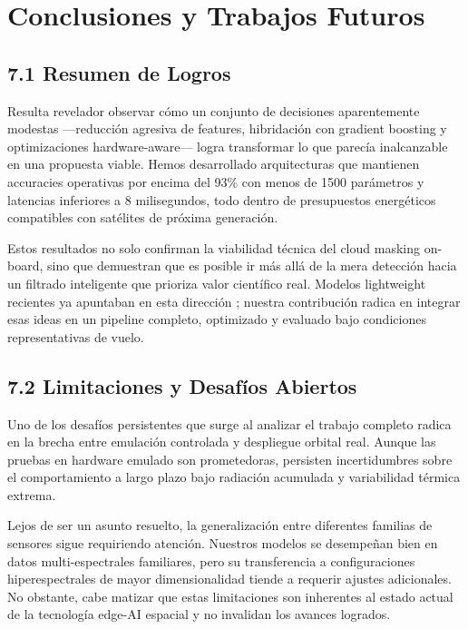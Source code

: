 \section{Conclusiones y Trabajos Futuros}

\subsection{7.1 Resumen de Logros}

Resulta revelador observar cómo un conjunto de decisiones aparentemente modestas —reducción agresiva de features, hibridación con gradient boosting y optimizaciones hardware-aware— logra transformar lo que parecía inalcanzable en una propuesta viable. Hemos desarrollado arquitecturas que mantienen accuracies operativas por encima del 93\% con menos de 1500 parámetros y latencias inferiores a 8 milisegundos, todo dentro de presupuestos energéticos compatibles con satélites de próxima generación.

Estos resultados no solo confirman la viabilidad técnica del cloud masking on-board, sino que demuestran que es posible ir más allá de la mera detección hacia un filtrado inteligente que prioriza valor científico real. Modelos lightweight recientes ya apuntaban en esta dirección \cite{Ali2026_Lightweight}; nuestra contribución radica en integrar esas ideas en un pipeline completo, optimizado y evaluado bajo condiciones representativas de vuelo.

\subsection{7.2 Limitaciones y Desafíos Abiertos}

Uno de los desafíos persistentes que surge al analizar el trabajo completo radica en la brecha entre emulación controlada y despliegue orbital real. Aunque las pruebas en hardware emulado son prometedoras, persisten incertidumbres sobre el comportamiento a largo plazo bajo radiación acumulada y variabilidad térmica extrema. 

Lejos de ser un asunto resuelto, la generalización entre diferentes familias de sensores sigue requiriendo atención. Nuestros modelos se desempeñan bien en datos multi-espectrales familiares, pero su transferencia a configuraciones hiperespectrales de mayor dimensionalidad tiende a requerir ajustes adicionales. No obstante, cabe matizar que estas limitaciones son inherentes al estado actual de la tecnología edge-AI espacial y no invalidan los avances logrados.

